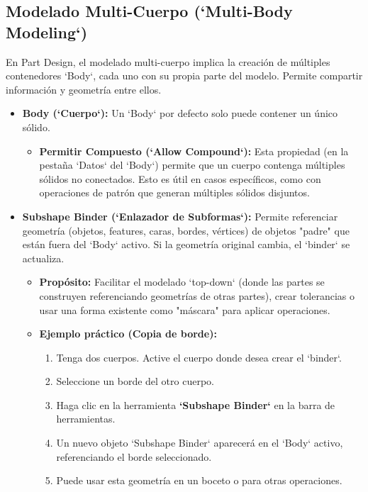 \documentclass[12pt]{article}
\begin{document}
\subsection{Modelado Multi-Cuerpo (`Multi-Body Modeling`)}
En Part Design, el modelado multi-cuerpo implica la creación de múltiples contenedores `Body`, cada uno con su propia parte del modelo. Permite compartir información y geometría entre ellos.
\begin{itemize}[label=\textbullet]
    \item \textbf{Body (`Cuerpo`):} Un `Body` por defecto solo puede contener un único sólido.
    \begin{itemize}[label=\textendash]
        \item \textbf{Permitir Compuesto (`Allow Compound`):} Esta propiedad (en la pestaña `Datos` del `Body`) permite que un cuerpo contenga múltiples sólidos no conectados. Esto es útil en casos específicos, como con operaciones de patrón que generan múltiples sólidos disjuntos.
    \end{itemize}
    \item \textbf{Subshape Binder (`Enlazador de Subformas`):} Permite referenciar geometría (objetos, features, caras, bordes, vértices) de objetos "padre" que están fuera del `Body` activo. Si la geometría original cambia, el `binder` se actualiza.
    \begin{itemize}[label=\textendash]
        \item \textbf{Propósito:} Facilitar el modelado `top-down` (donde las partes se construyen referenciando geometrías de otras partes), crear tolerancias o usar una forma existente como "máscara" para aplicar operaciones.
        \item \textbf{Ejemplo práctico (Copia de borde):}
        \begin{enumerate}[label=\arabic*)]
            \item Tenga dos cuerpos. Active el cuerpo donde desea crear el `binder`.
            \item Seleccione un borde del otro cuerpo.
            \item Haga clic en la herramienta \textbf{`Subshape Binder`} en la barra de herramientas.
            \item Un nuevo objeto `Subshape Binder` aparecerá en el `Body` activo, referenciando el borde seleccionado.
            \item Puede usar esta geometría en un boceto o para otras operaciones.
        \end{enumerate}

\end{itemize}
\end{itemize}
\end{document}
